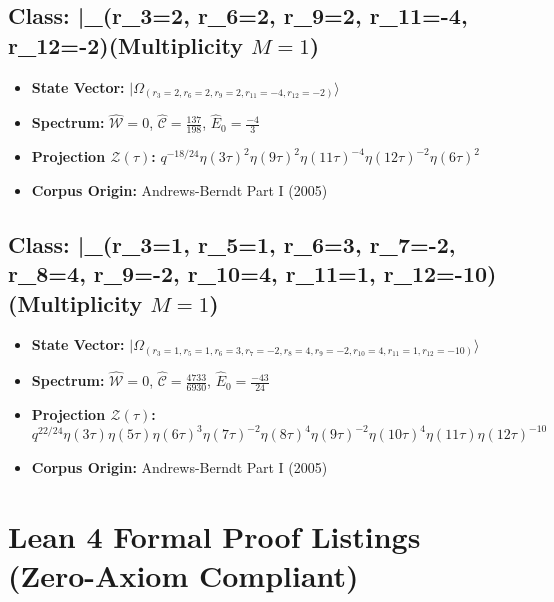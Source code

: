 \documentclass[11pt,twoside,openright]{book}
\begin{document}
\section*{Class: |\Omega_{(r_{3}=2, r_{6}=2, r_{9}=2, r_{11}=-4, r_{12}=-2)}\rangle (Multiplicity $M=1$)}
\begin{itemize}
  \item \textbf{State Vector:} $|\Omega_{(r_{3}=2, r_{6}=2, r_{9}=2, r_{11}=-4, r_{12}=-2)}\rangle$
  \item \textbf{Spectrum:} $\hat{\mathcal{W}} = 0$, $\hat{\mathcal{C}} = \frac{137}{198}$, $\hat{E}_0 = \frac{-4}{3}$
  \item \textbf{Projection $\mathcal{Z}(\tau)$:} $q^{-18/24} \eta(3\tau)^{2} \eta(9\tau)^{2} \eta(11\tau)^{-4} \eta(12\tau)^{-2} \eta(6\tau)^{2}$
  \item \textbf{Corpus Origin:} Andrews-Berndt Part I (2005)
\end{itemize}

\section*{Class: |\Omega_{(r_{3}=1, r_{5}=1, r_{6}=3, r_{7}=-2, r_{8}=4, r_{9}=-2, r_{10}=4, r_{11}=1, r_{12}=-10)}\rangle (Multiplicity $M=1$)}
\begin{itemize}
  \item \textbf{State Vector:} $|\Omega_{(r_{3}=1, r_{5}=1, r_{6}=3, r_{7}=-2, r_{8}=4, r_{9}=-2, r_{10}=4, r_{11}=1, r_{12}=-10)}\rangle$
  \item \textbf{Spectrum:} $\hat{\mathcal{W}} = 0$, $\hat{\mathcal{C}} = \frac{4733}{6930}$, $\hat{E}_0 = \frac{-43}{24}$
  \item \textbf{Projection $\mathcal{Z}(\tau)$:} $q^{22/24} \eta(3\tau) \eta(5\tau) \eta(6\tau)^{3} \eta(7\tau)^{-2} \eta(8\tau)^{4} \eta(9\tau)^{-2} \eta(10\tau)^{4} \eta(11\tau) \eta(12\tau)^{-10}$
  \item \textbf{Corpus Origin:} Andrews-Berndt Part I (2005)
\end{itemize}


\appendix
\chapter{Lean 4 Formal Proof Listings (Zero-Axiom Compliant)}
\end{document}
